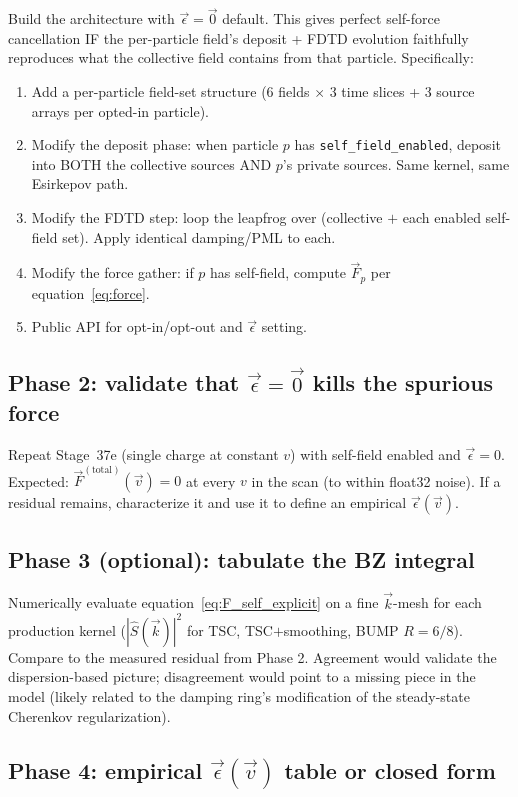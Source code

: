 \documentclass[11pt,a4paper]{article}
\begin{document}
Build the architecture with $\vec\epsilon = \vec 0$ default.  This gives perfect self-force cancellation IF the per-particle field's deposit + FDTD evolution faithfully reproduces what the collective field contains from that particle.  Specifically:
\begin{enumerate}
  \item Add a per-particle field-set structure (6 fields $\times$ 3 time slices + 3 source arrays per opted-in particle).
  \item Modify the deposit phase: when particle $p$ has \verb|self_field_enabled|, deposit into BOTH the collective sources AND $p$'s private sources.  Same kernel, same Esirkepov path.
  \item Modify the FDTD step: loop the leapfrog over (collective $+$ each enabled self-field set).  Apply identical damping/PML to each.
  \item Modify the force gather: if $p$ has self-field, compute $\vec F_p$ per equation~\ref{eq:force}.
  \item Public API for opt-in/opt-out and $\vec\epsilon$ setting.
\end{enumerate}

\subsection{Phase 2: validate that $\vec\epsilon = \vec 0$ kills the spurious force}

Repeat Stage~37e (single charge at constant $v$) with self-field enabled and $\vec\epsilon = 0$.  Expected: $\vec F^{(\mathrm{total})}(\vec v) = 0$ at every $v$ in the scan (to within float32 noise).  If a residual remains, characterize it and use it to define an empirical $\vec\epsilon(\vec v)$.

\subsection{Phase 3 (optional): tabulate the BZ integral}

Numerically evaluate equation~\ref{eq:F_self_explicit} on a fine $\vec k$-mesh for each production kernel ($|\hat S(\vec k)|^2$ for TSC, TSC$+$smoothing, BUMP $R=6/8$).  Compare to the measured residual from Phase 2.  Agreement would validate the dispersion-based picture; disagreement would point to a missing piece in the model (likely related to the damping ring's modification of the steady-state Cherenkov regularization).

\subsection{Phase 4: empirical $\vec\epsilon(\vec v)$ table or closed form}
\end{document}
